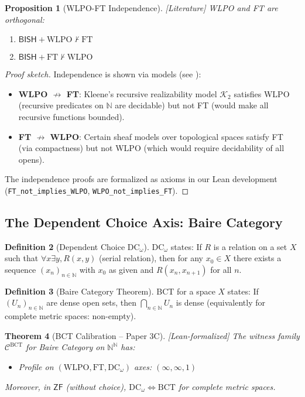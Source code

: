\documentclass[11pt]{article}
\theoremstyle{plain}
\newtheorem{theorem}{Theorem}[section]
\newtheorem{proposition}[theorem]{Proposition}
\theoremstyle{definition}
\newtheorem{definition}[theorem]{Definition}
\newcommand{\N}{\mathbb{N}}
\newcommand{\WLPO}{\mathrm{WLPO}}
\newcommand{\FT}{\mathrm{FT}}
\newcommand{\DCw}{\mathrm{DC}_\omega}
\newcommand{\BCT}{\mathrm{BCT}}
\newcommand{\BISH}{\mathsf{BISH}}
\newcommand{\ZF}{\mathsf{ZF}}
\newcommand{\leanok}{\textsf{\textcolor{green!70!black}{[Lean-formalized]}}}
\newcommand{\leancited}{\textsf{\textcolor{blue!70!black}{[Literature]}}}
\begin{document}
\begin{proposition}[WLPO-FT Independence]\label{prop:orthogonal} \leancited
WLPO and FT are orthogonal:
\begin{enumerate}
\item $\BISH + \WLPO \not\vdash \FT$
\item $\BISH + \FT \not\vdash \WLPO$
\end{enumerate}
\end{proposition}

\begin{proof}[Proof sketch]
Independence is shown via models (see \cite{vanDalen1997, Beeson1985}):
\begin{itemize}
\item \textbf{WLPO $\not\rightarrow$ FT}: Kleene's recursive realizability model $\mathcal{K}_2$ satisfies WLPO (recursive predicates on $\N$ are decidable) but not FT (would make all recursive functions bounded).
\item \textbf{FT $\not\rightarrow$ WLPO}: Certain sheaf models over topological spaces satisfy FT (via compactness) but not WLPO (which would require decidability of all opens).
\end{itemize}
The independence proofs are formalized as axioms in our Lean development (\texttt{FT\_not\_implies\_WLPO}, \texttt{WLPO\_not\_implies\_FT}).
\end{proof}

\subsection{The Dependent Choice Axis: Baire Category}

\begin{definition}[Dependent Choice $\DCw$]\label{def:dcw}
$\DCw$ states: If $R$ is a relation on a set $X$ such that $\forall x \exists y, R(x,y)$ (serial relation), then for any $x_0 \in X$ there exists a sequence $(x_n)_{n \in \N}$ with $x_0$ as given and $R(x_n, x_{n+1})$ for all $n$.
\end{definition}

\begin{definition}[Baire Category Theorem]\label{def:bct}
BCT for a space $X$ states: If $(U_n)_{n \in \N}$ are dense open sets, then $\bigcap_{n \in \N} U_n$ is dense (equivalently for complete metric spaces: non-empty).
\end{definition}

\begin{theorem}[BCT Calibration -- Paper 3C]\label{thm:bct-calib} \leanok
The witness family $\mathcal{C}^{\BCT}$ for Baire Category on $\N^\N$ has:
\begin{itemize}
\item Profile on $(\WLPO, \FT, \DCw)$ axes: $(\infty, \infty, 1)$
\end{itemize}
Moreover, in $\ZF$ (without choice), $\DCw \Leftrightarrow \BCT$ for complete metric spaces.
\end{theorem}
\end{document}
